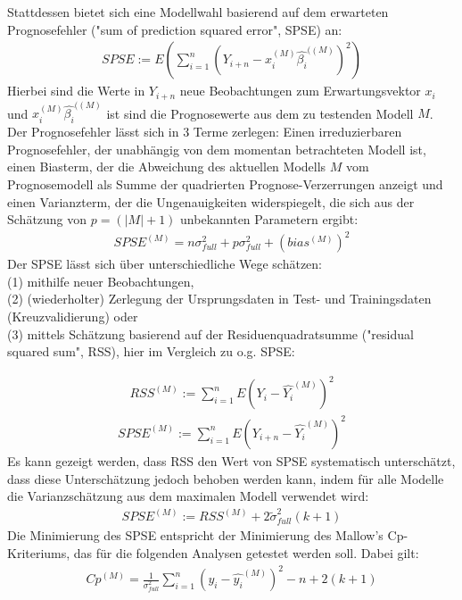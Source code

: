 	Stattdessen bietet sich eine Modellwahl basierend auf dem erwarteten Prognosefehler ("sum of prediction squared error", SPSE) an:
	\begin{align*}
		SPSE := E(\sum_{i=1}^{n} (Y_{i+n} - x_{i}^{(M)}\hat{\beta_i}^{((M)})^2)
	\end{align*}
	Hierbei sind die Werte in $Y_{i+n}$ neue Beobachtungen zum Erwartungsvektor $x_i$ und $x_{i}^{(M)}\hat{\beta_i}^{((M)}$ ist sind die Prognosewerte aus dem zu testenden Modell $M$.
	Der Prognosefehler lässt sich in 3 Terme zerlegen: Einen irreduzierbaren Prognosefehler, der unabhängig von dem momentan betrachteten Modell ist, einen Biasterm, der die Abweichung des aktuellen Modells $M$ vom Prognosemodell als Summe der quadrierten Prognose-Verzerrungen anzeigt und einen Varianzterm, der die Ungenauigkeiten widerspiegelt, die sich aus der Schätzung von $p = (|M|+1)$ unbekannten Parametern ergibt:
	\begin{align*}
	SPSE^{(M)} = n\sigma_{full}^2 + p\sigma_{full}^2 + (bias^{(M)})^2
	\end{align*}
	Der SPSE lässt sich über unterschiedliche Wege schätzen: \\(1) mithilfe neuer Beobachtungen, \\(2) (wiederholter) Zerlegung der Ursprungsdaten in Test- und Trainingsdaten (Kreuzvalidierung)  oder \\(3) mittels Schätzung basierend auf der Residuenquadratsumme ("residual squared sum", RSS), hier im Vergleich zu o.g. SPSE:

	\begin{align*}
	RSS^{(M)} := \sum_{i=1}^{n} E (Y_{i} - \hat{Y_i}^{(M)})^2
	\end{align*}
	\begin{align*}
	SPSE^{(M)} := \sum_{i=1}^{n} E (Y_{i+n} - \hat{Y_i}^{(M)})^2
	\end{align*}
	Es kann gezeigt werden, dass RSS den Wert von SPSE systematisch unterschätzt, dass diese Unterschätzung jedoch behoben werden kann, indem für alle Modelle die Varianzschätzung aus dem maximalen Modell verwendet wird\cite{Schumacher.2019}:
	\begin{align*}
	SPSE^{(M)} := RSS^{(M)} + 2 \tilde{\sigma}_{full} ^2 (k+1)
	\end{align*}
	Die Minimierung des SPSE entspricht der Minimierung des Mallow's Cp- Kriteriums, das für die folgenden Analysen getestet werden soll. Dabei gilt:
	\begin{align*}
	Cp^{(M)} = \frac{1}{\sigma_{full}^2} \sum_{i=1}^{n} (y_i - \hat{y_i}^{(M)})^2 - n + 2(k+1)
	\end{align*}



